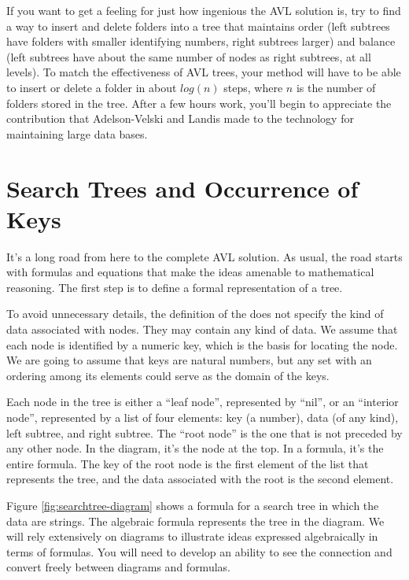 If you want to get a feeling for just how ingenious the AVL
solution is, try to find a way to insert and delete folders into a
tree that maintains order (left subtrees have folders with smaller
identifying numbers, right subtrees larger) and balance (left
subtrees have about the same number of nodes as right subtrees, at
all levels). To match the effectiveness of AVL trees, your method
will have to be able to insert or delete a folder in about
$log(n)$ steps, where $n$ is the number of folders stored
in the tree.  
After a few hours work, you'll begin to appreciate
the contribution that Adelson-Velski and Landis made to the technology for
maintaining large data bases.

\section{Search Trees and Occurrence of Keys}

It's a long road from here to the complete AVL solution. As usual,
the road starts with formulas and equations that make the ideas
amenable to mathematical reasoning.
The first step is to define a formal representation of a tree.

To avoid unnecessary details, the definition of the
does not specify the kind of data associated with nodes.
They may contain any kind of data.
We assume that each node is identified by a numeric key,
which is the basis for locating the node.
We are going to assume that keys are natural numbers,
but any set with an ordering among its elements could serve
as the domain of the keys.

\label{leaf-node}
Each node in the tree is either a ``leaf node'', represented by ``nil'',
\label{interior-node}
or an ``interior node'', represented by a list of four elements:
key (a number), data (of any kind), left subtree, and right subtree.
\label{root-node}
The ``root node'' is the one that is not preceded by any other node.
In the diagram, it's the node at the top.
In a formula, it's the entire formula.
The key of the root node is the first element of the list that represents the tree,
and the data associated with the root is the second element.

Figure \ref{fig:searchtree-diagram} shows a formula
for a search tree in which the data are strings.
The algebraic formula represents the tree in the diagram.
We will rely extensively on diagrams to
illustrate ideas expressed algebraically in terms of formulas.
You will need to develop an ability to see the connection
and convert freely between diagrams and formulas.

